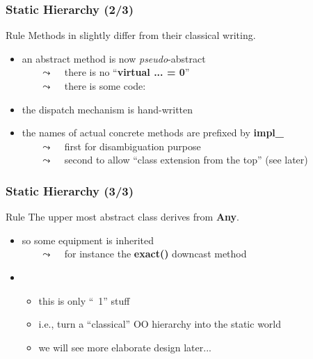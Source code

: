 \begin{frame}
  \frametitle{\scoop Static Hierarchy (2/3)}


  \begin{block}{Rule}
    Methods in \scoop slightly differ from their classical writing.
  \end{block}

  \medskip

  \begin{itemize}
  \item an abstract method is now \textit{pseudo}-abstract\\
    ~~~ {\scriptsize $\leadsto$ ~ there is no ``\textbf{virtual ... = 0}'' }\\
    ~~~ {\scriptsize $\leadsto$ ~ there is some code: }
    \smallskip
  \item the dispatch mechanism is hand-written
    \smallskip
  \item the names of actual concrete methods are prefixed by \textbf{impl\_}\\
    ~~~ {\scriptsize $\leadsto$ ~ first for disambiguation purpose } \\
    ~~~ {\scriptsize $\leadsto$ ~ second to allow ``class extension from the top'' (see later) }
  \end{itemize}

\end{frame}



\begin{frame}
  \frametitle{\scoop Static Hierarchy (3/3)}

  \begin{block}{Rule}
    The upper most abstract class derives from \textbf{Any}.
  \end{block}

  \medskip

  \begin{itemize}
  \item so some equipment is inherited\\
    ~~~ {\scriptsize $\leadsto$ ~ for instance the \textbf{exact()} downcast method }
    \smallskip
  \item {\color{red}{warning:}}
    \begin{itemize}
    \item this is only ``\scoop~1'' stuff
    \item i.e., turn a ``classical'' OO hierarchy into the static world
    \item we will see more elaborate design later...
    \end{itemize}
  \end{itemize}

\end{frame}





